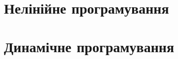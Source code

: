 \documentclass[a5paper,10pt]{book}
\providecommand{\main}{.}
\begin{document}
\setcounter{tocdepth}{1}
\tableofcontents




\chapter{Нелінійне програмування}

\chapter{Динамічне програмування}
\end{document}
